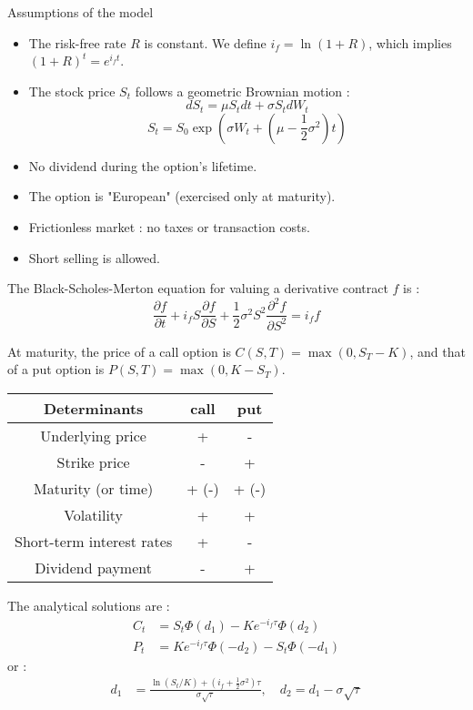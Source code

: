 \begin{f}
Assumptions of the model
\begin{itemize}
	\item The risk-free rate \(R\) is constant. We define \(i_f = \ln(1+R)\), which implies \((1+R)^t = e^{i_f t}\).
	\item The stock price \(S_t\) follows a geometric Brownian motion :
	\[
	dS_t = \mu S_t dt + \sigma S_t dW_t 
	\]
	\[
	 S_t = S_0 \exp\left(\sigma W_t + \left( \mu - \frac{1}{2}\sigma^2 \right)t \right)
	\]
	\item No dividend during the option's lifetime.  
	\item The option is "European" (exercised only at maturity).  
	\item Frictionless market : no taxes or transaction costs.  
	\item Short selling is allowed. 
\end{itemize}

The Black-Scholes-Merton equation for valuing a derivative contract \(f\) is :
\[
\frac{\partial f}{\partial t} + i_f S \frac{\partial f}{\partial S} + \frac{1}{2}\sigma^2 S^2 \frac{\partial^2 f}{\partial S^2} = i_f f
\]

At maturity, the price of a call option is \(C(S,T) = \max(0, S_T - K)\), and that of a put option is \(P(S,T) = \max(0, K - S_T)\).


\begin{center}
	\begin{tabular}{|c|c|c|}
		\hline
		Determinants & \textbf{call}&\textbf{put}\\
		\hline
		Underlying price	      & +&	-\\
		Strike price	              & -&	+\\
		Maturity (or time)    & + (-)&	+ (-)\\
		Volatility	              & +&	+\\
		Short-term interest rates  & +&	-\\
		Dividend payment	      & -&	+\\
		\hline
	\end{tabular}
\end{center}

The analytical solutions are :
\begin{align*}
	C_t &= S_t \Phi(d_1) - Ke^{-i_f \tau} \Phi(d_2) \\
	P_t &= Ke^{-i_f \tau} \Phi(-d_2) - S_t \Phi(-d_1)
\end{align*}
or :
\begin{align*}
	d_1 &= \frac{\ln(S_t/K) + (i_f + \frac{1}{2}\sigma^2)\tau}{\sigma \sqrt{\tau}}, \quad
	d_2 = d_1 - \sigma \sqrt{\tau}
\end{align*}


\end{f}
